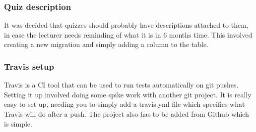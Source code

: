 \subsubsection{Quiz description}
It was decided that quizzes should probably have descriptions attached to them, in case the lecturer needs reminding of what it is in 6 months time. This involved creating a new migration and simply adding a column to the table.
\subsubsection{Travis setup}
Travis is a CI tool that can be used to run tests automatically on git pushes. Setting it up involved doing some spike work with another git project. It is really easy to set up, needing you to simply add a travis.yml file which specifies what Travis will do after a push. The project also has to be added from Github which is simple.
\newpage
